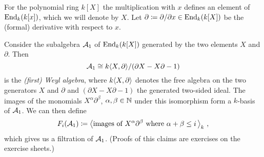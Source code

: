 \begin{example}
  \label{example: weyl algebra}
  For the polynomial ring $k[X]$ the multiplication with $x$ defines an element of $\operatorname{End}_k(k[x])$, which we will denote by $X$.
  Let $\partial \coloneqq \partial/\partial x \in \operatorname{End}_k(k[X])$ be the (formal) derivative with respect to $x$.
  
  Consider the subalgebra $\mathcal{A}_1$ of $\operatorname{End}_k(k[X])$ generated by the two elements $X$ and $\partial$.
  Then
  \[
          \mathcal{A}_1
    \cong k{\left\langle X,\partial \right\rangle}/ (\partial X - X \partial - 1)
  \]
  is the \emph{\textup(first\textup) Weyl algebra}, where $k{\left\langle X,\partial \right\rangle}$ denotes the free algebra on the two generators $X$ and $\partial$ and $(\partial X - X \partial - 1)$ the generated two-sided ideal.
  The images of the monomials $X^\alpha \partial^\beta$, $\alpha, \beta \in \mathbb{N}$ under this isomorphism form a $k$-basis of $\mathcal{A}_1$.
  We can then define
  \[
              F_i(\mathcal{A}_1)
    \coloneqq \left\langle  \text{images of $X^\alpha \partial^\beta$ where $\alpha+\beta \leq i$} \,  \right\rangle_k \,,
  \]
  which gives us a filtration of $\mathcal{A}_1$.
  (Proofs of this claims are exercises on the exercise sheets.)
\end{example}
